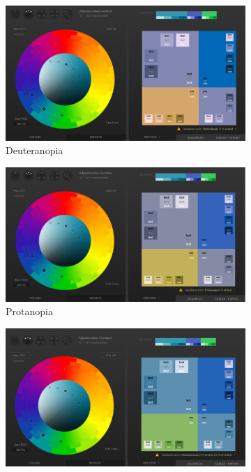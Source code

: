 \begin{figure}[bh]
    \centering
    \begin{subfigure}[b]{0.4\linewidth}
        \includegraphics[width=\linewidth]{figures/color-scheme-deuteranopia.png}
        \caption{Deuteranopia}
    \end{subfigure}
    \begin{subfigure}[b]{0.4\linewidth}
        \includegraphics[width=\linewidth]{figures/color-scheme-protanopia.png}
        \caption{Protanopia}
    \end{subfigure}
    \begin{subfigure}[b]{0.4\linewidth}
        \includegraphics[width=\linewidth]{figures/color-scheme-deuteranomaly.png}

\end{subfigure}
\end{figure}
